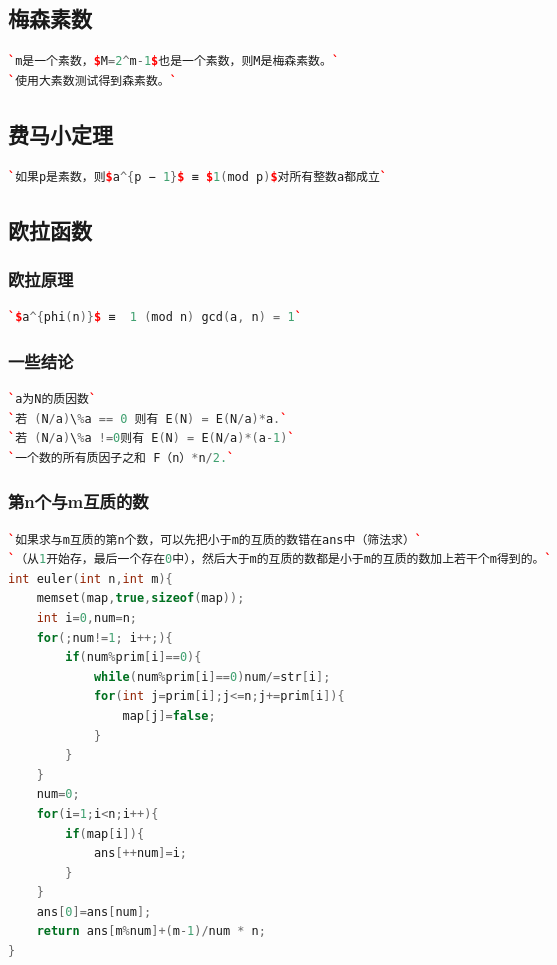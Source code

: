 \documentclass[a4paper]{article}
\begin{document}
\begin{CJK*}{UTF8}{gbsn}
\begin{multicols}{3}
\begin{flushleft}
\subsection{梅森素数}
\begin{lstlisting}[language={c++}]
`m是一个素数，$M=2^m-1$也是一个素数，则M是梅森素数。`
`使用大素数测试得到森素数。`
\end{lstlisting}



\subsection{费马小定理}
\begin{lstlisting}[language={c++}]
`如果p是素数，则$a^{p − 1}$ ≡ $1(mod p)$对所有整数a都成立`
\end{lstlisting}



\subsection{欧拉函数}

\subsubsection{欧拉原理}
\begin{lstlisting}[language={c++}]
`$a^{phi(n)}$ ≡  1 (mod n) gcd(a, n) = 1`
\end{lstlisting}

\subsubsection{一些结论}
\begin{lstlisting}[language={c++}]
`a为N的质因数`
`若 (N/a)\%a == 0 则有 E(N) = E(N/a)*a.`
`若 (N/a)\%a !=0则有 E(N) = E(N/a)*(a-1)`
`一个数的所有质因子之和 F（n）*n/2.`
\end{lstlisting}


\subsubsection{第n个与m互质的数}
\begin{lstlisting}[language={c++}]
`如果求与m互质的第n个数，可以先把小于m的互质的数错在ans中（筛法求）`
`（从1开始存，最后一个存在0中），然后大于m的互质的数都是小于m的互质的数加上若干个m得到的。`
int euler(int n,int m){
    memset(map,true,sizeof(map));
    int i=0,num=n;
    for(;num!=1; i++;){
        if(num%prim[i]==0){
            while(num%prim[i]==0)num/=str[i];
            for(int j=prim[i];j<=n;j+=prim[i]){
                map[j]=false;
            }
        }
    }
    num=0;
    for(i=1;i<n;i++){
        if(map[i]){
            ans[++num]=i;
        }
    }
    ans[0]=ans[num];
    return ans[m%num]+(m-1)/num * n;
}
\end{lstlisting}



\end{flushleft}
\end{multicols}
\end{CJK*}
\end{document}
